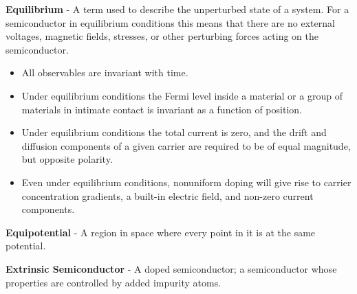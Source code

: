 \vspace{0.5cm}
    \textbf{Equilibrium} - A term used to describe the unperturbed state of a system.  For a semiconductor in equilibrium conditions this means that there are no external voltages, magnetic fields, stresses, or other perturbing forces acting on the semiconductor.
    \vspace{0.15cm}
    \begin{itemize}
        \setlength\itemsep{0.5em}
        \item{All observables are invariant with time.}
        \item{Under equilibrium conditions the Fermi level inside a material or a group of materials in intimate contact is invariant as a function of position.}
        \item{Under equilibrium conditions the total current is zero, and the drift and diffusion components of a given carrier are required to be of equal magnitude, but opposite polarity.}
        \item{Even under equilibrium conditions, nonuniform doping will give rise to carrier concentration gradients, a built-in electric field, and non-zero current components.}
    \end{itemize}
\vspace{0.5cm}
    \textbf{Equipotential} - A region in space where every point in it is at the same potential.

\vspace{0.5cm}
\noindent
    \textbf{Extrinsic Semiconductor} - A doped semiconductor; a semiconductor whose properties are controlled by added impurity atoms.
